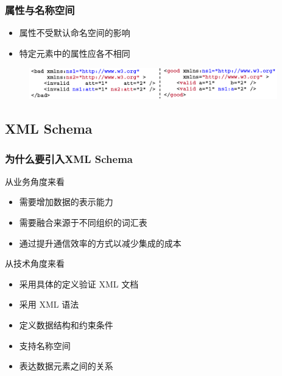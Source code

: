 \subsubsection{属性与名称空间}
\vspace{-0.8em}
\begin{multicols}{2}
    \begin{itemize}
        \item 属性不受默认命名空间的影响
        \item 特定元素中的属性应各不相同
    \end{itemize}
\end{multicols}
\vspace{-1em}
\begin{figure}[H]
    \vspace{-0.5em}
	\centering
	\includegraphics[width=0.96\textwidth]{images/属性与名称空间}
    \vspace{-1em}
\end{figure}

\subsection{XML Schema}

\subsubsection{为什么要引入XML Schema}
从业务角度来看
\vspace{-0.8em}
\begin{multicols}{2}
    \begin{itemize}
        \item 需要增加数据的表示能力
		\item 需要融合来源于不同组织的词汇表
		\item 通过提升通信效率的方式以减少集成的成本
    \end{itemize}
\end{multicols}
\vspace{-1em}

从技术角度来看
\vspace{-0.8em}
\begin{multicols}{2}
    \begin{itemize}
		\item 采用具体的定义验证 XML 文档
		\item 采用 XML 语法
		\item 定义数据结构和约束条件
		\item 支持名称空间
		\item 表达数据元素之间的关系
    \end{itemize}
\end{multicols}
\vspace{-1em}


